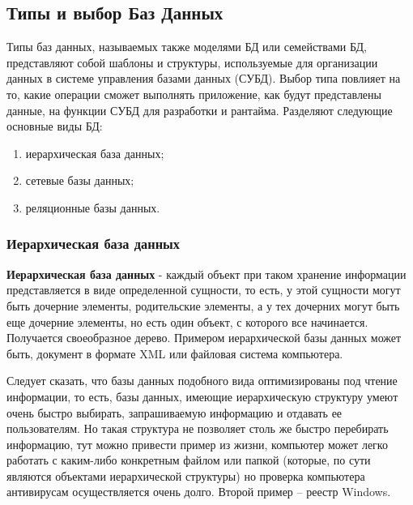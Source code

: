 \documentclass[a4paper, 10pt]{article}
\begin{document}
	\subsection{Типы и выбор Баз Данных}
	\hspace*{5mm}Типы баз данных, называемых также моделями БД или семействами БД, представляют собой шаблоны и структуры, используемые для организации данных в системе управления базами данных (СУБД). Выбор типа повлияет на то, какие операции сможет выполнять приложение, как будут представлены данные, на функции СУБД для разработки и рантайма. Разделяют следующие основные виды БД:
	 \begin{enumerate}
	 	\item иерархическая база данных;
	 	\item сетевые базы данных;
	 	\item реляционные базы данных.
	 \end{enumerate}
	\subsubsection{Иерархическая база данных}
	\hspace*{5mm} \textbf{Иерархическая база данных} -  каждый объект при таком хранение информации представляется в виде определенной сущности, то есть, у этой сущности могут быть дочерние элементы, родительские элементы, а у тех дочерних могут быть еще дочерние элементы, но есть один объект, с которого все начинается. Получается своеобразное дерево. Примером иерархической базы данных может быть, документ в формате XML или файловая система компьютера.
	
	 \hspace*{5mm}Следует сказать, что базы данных подобного вида оптимизированы под чтение информации, то есть, базы данных, имеющие иерархическую структуру умеют очень быстро выбирать, запрашиваемую информацию и отдавать ее пользователям. Но такая структура не позволяет столь же быстро перебирать информацию, тут можно привести пример из жизни, компьютер может легко работать с каким-либо конкретным файлом или папкой (которые, по сути являются объектами иерархической структуры) но проверка компьютера антивирусам осуществляется очень долго. Второй пример – реестр Windows.
	 
\end{document}
